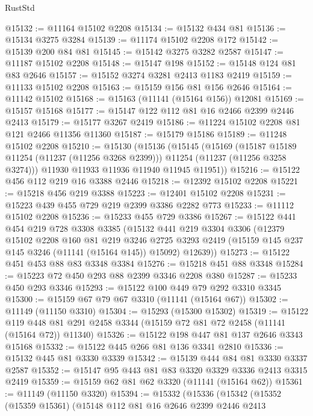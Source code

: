 \begin{lexlean}{RustStd}
\begin{coremodule}
@15132 := @11164 @15102 @2208
@15134 := @15132 @434 @81
@15136 := @15134 @3275 @3284
@15139 := @11174 @15102 @2208 @172
@15142 := @15139 @200 @84 @81
@15145 := @15142 @3275 @3282 @2587
@15147 := @11187 @15102 @2208
@15148 := @15147 @198
@15152 := @15148 @124 @81 @83 @2646
@15157 := @15152 @3274 @3281 @2413 @1183 @2419
@15159 := @11133 @15102 @2208
@15163 := @15159 @156 @81 @156 @2646
@15164 := @11142 @15102
@15168 := @15163 (@11141 (@15164 @156)) @12081
@15169 := @15157 @15168
@15177 := @15147 @122 @112 @81 @16 @2466 @2399 @2446 @2413
@15179 := @15177 @3267 @2419
@15186 := @11224 @15102 @2208 @81 @121 @2466 @11356 @11360
@15187 := @15179 @15186
@15189 := @11248 @15102 @2208
@15210 := @15130
    (@15136
      (@15145
        (@15169
          (@15187 @15189 @11254 (@11237 (@11256 @3268 @2399)))
          @11254
          (@11237 (@11256 @3258 @3274)))
        @11930
        @11933
        @11936
        @11940
        @11945
        @11951))
@15216 := @15122 @456 @112 @219 @16 @3388 @2446
@15218 := @12392 @15102 @2208
@15221 := @15218 @456 @219 @3388
@15223 := @12401 @15102 @2208
@15231 := @15223 @439 @455 @729 @219 @2399 @3386 @2282 @773
@15233 := @11112 @15102 @2208
@15236 := @15233 @455 @729 @3386
@15267 := @15122
    @441
    @454
    @219
    @728
    @3308
    @3385
    (@15132
      @441
      @219
      @3304
      @3306
      (@12379
        @15102
        @2208
        @160
        @81
        @219
        @3246
        @2725
        @3293
        @2419
        (@15159 @145 @237 @145 @3246 (@11141 (@15164 @145)) @15092)
        @12639))
@15273 := @15122 @451 @453 @88 @83 @3348 @3384
@15276 := @15218 @451 @88 @3348
@15284 := @15223 @72 @450 @293 @88 @2399 @3346 @2208 @380
@15287 := @15233 @450 @293 @3346
@15293 := @15122 @100 @449 @79 @292 @3310 @3345
@15300 := @15159 @67 @79 @67 @3310 (@11141 (@15164 @67))
@15302 := @11149 (@11150 @3310)
@15304 := @15293 (@15300 @15302)
@15319 := @15122
    @119
    @448
    @81
    @291
    @2458
    @3344
    (@15159 @72 @81 @72 @2458 (@11141 (@15164 @72)) @11340)
@15326 := @15122 @198 @447 @81 @137 @2646 @3343 @15168
@15332 := @15122 @445 @266 @81 @136 @3341 @2810
@15336 := @15132 @445 @81 @3330 @3339
@15342 := @15139 @444 @84 @81 @3330 @3337 @2587
@15352 := @15147 @95 @443 @81 @83 @3320 @3329 @3336 @2413 @3315 @2419
@15359 := @15159 @62 @81 @62 @3320 (@11141 (@15164 @62))
@15361 := @11149 (@11150 @3320)
@15394 := @15332
    (@15336
      (@15342
        (@15352
          (@15359 @15361)
          (@15148
            @112
            @81
            @16
            @2646
            @2399
            @2446
            @2413

\end{coremodule}
\end{lexlean}
